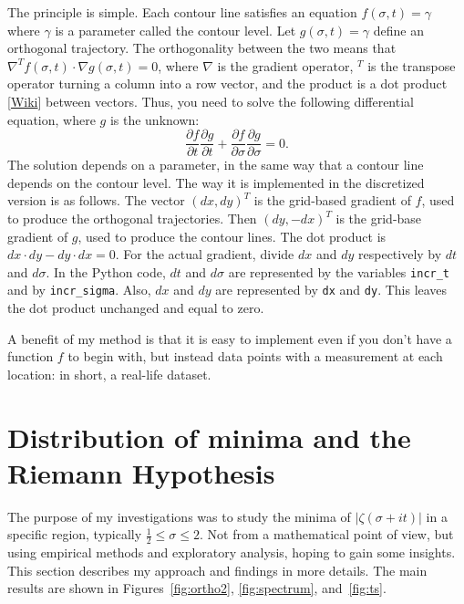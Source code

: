 \documentclass[oneside,10pt]{book}
\begin{document}
The principle is simple. Each contour line satisfies an equation $f(\sigma, t) =\gamma$ where $\gamma$ is a parameter called the
 \textcolor{index}{contour level}. Let $g(\sigma,t) = \gamma$ define an orthogonal trajectory. The orthogonality between the two means that $\nabla^T f(\sigma, t) \cdot  \nabla g(\sigma, t) = 0$, where $\nabla$ is the gradient operator, $^T$ is the transpose operator turning a column into a row vector, and the product is a dot product [\href{https://en.wikipedia.org/wiki/Dot_product}{Wiki}] between vectors. 
Thus, you need to solve the following differential equation, where $g$ is the unknown:
$$
 \frac{\partial f}{\partial t} \frac{\partial g}{\partial t} + \frac{\partial f}{\partial \sigma} \frac{\partial g}{\partial \sigma} = 0.
$$ 
The solution depends on a parameter, in the same way that a contour line depends on the contour level. The way it is implemented in the discretized version is as follows. The vector $(dx,dy)^T$ 
is the grid-based  gradient of $f$, used to produce the orthogonal trajectories. Then 
  $(dy, -dx)^T$ is the grid-base gradient of $g$, used to produce the contour lines. The dot product is $dx \cdot dy - dy \cdot dx = 0$. For the actual gradient, divide $dx$ and $dy$ respectively by  $dt$ and $d\sigma$. 
In the Python code,  $dt$ and $d\sigma$ are represented by the variables \texttt{incr\_t} and by \texttt{incr\_sigma}.
Also, $dx$ and $dy$ are represented by \texttt{dx} and \texttt{dy}. This leaves the dot product unchanged and equal to zero.

A benefit of my method is that it is easy to implement even if you don't have a function $f$ to begin with, but instead data points with a measurement at each location: in short, a real-life dataset.



\section{Distribution of minima and the Riemann Hypothesis}\label{po0xz}

The purpose of my investigations was to study the minima of 
 $|\zeta(\sigma+it)|$ in a specific region, typically $\frac{1}{2}\leq \sigma \leq 2$. Not from a mathematical point of view, but using empirical methods and exploratory analysis, hoping to gain some insights. This section describes my approach and findings in more details.
 The main results are shown in Figures~\ref{fig:ortho2}, \ref{fig:spectrum}, and~\ref{fig:ts}. 
\end{document}
